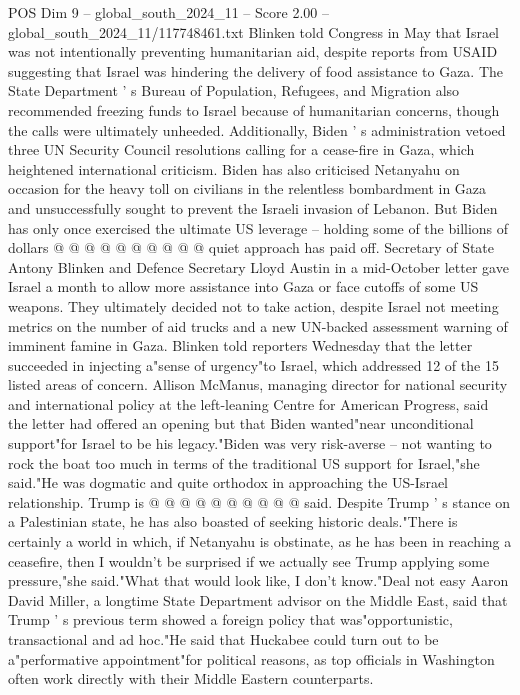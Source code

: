 \begin{textsample}{POS Dim 9 – global\_south\_2024\_11 – Score 2.00 – global\_south\_2024\_11/117748461.txt}
Blinken told Congress in May that Israel was not intentionally preventing humanitarian aid, despite reports from USAID suggesting that Israel was hindering the delivery of food assistance to Gaza.
The State Department ' s Bureau of Population, Refugees, and Migration also recommended freezing funds to Israel because of humanitarian concerns, though the calls were ultimately unheeded.
Additionally, Biden ' s administration vetoed three UN Security Council resolutions calling for a cease-fire in Gaza, which heightened international criticism.
Biden has also criticised Netanyahu on occasion for the heavy toll on civilians in the relentless bombardment in Gaza and unsuccessfully sought to prevent the Israeli invasion of Lebanon.
But Biden has only once exercised the ultimate US leverage -- holding some of the billions of dollars @ @ @ @ @ @ @ @ @ @ quiet approach has paid off.
Secretary of State Antony Blinken and Defence Secretary Lloyd Austin in a mid-October letter gave Israel a month to allow more assistance into Gaza or face cutoffs of some US weapons.
They ultimately decided not to take action, despite Israel not meeting metrics on the number of aid trucks and a new UN-backed assessment warning of imminent famine in Gaza.
Blinken told reporters Wednesday that the letter succeeded in injecting a"sense of urgency"to Israel, which addressed 12 of the 15 listed areas of concern.
Allison McManus, managing director for national security and international policy at the left-leaning Centre for American Progress, said the letter had offered an opening but that Biden wanted"near unconditional support"for Israel to be his legacy."Biden was very risk-averse -- not wanting to rock the boat too much in terms of the traditional US support for Israel,"she said."He was dogmatic and quite orthodox in approaching the US-Israel relationship.
Trump is @ @ @ @ @ @ @ @ @ @ said.
Despite Trump ' s stance on a Palestinian state, he has also boasted of seeking historic deals."There is certainly a world in which, if Netanyahu is obstinate, as he has been in reaching a ceasefire, then I wouldn't be surprised if we actually see Trump applying some pressure,"she said."What that would look like, I don't know."Deal not easy Aaron David Miller, a longtime State Department advisor on the Middle East, said that Trump ' s previous term showed a foreign policy that was"opportunistic, transactional and ad hoc."He said that Huckabee could turn out to be a"performative appointment"for political reasons, as top officials in Washington often work directly with their Middle Eastern counterparts.

\end{textsample}
